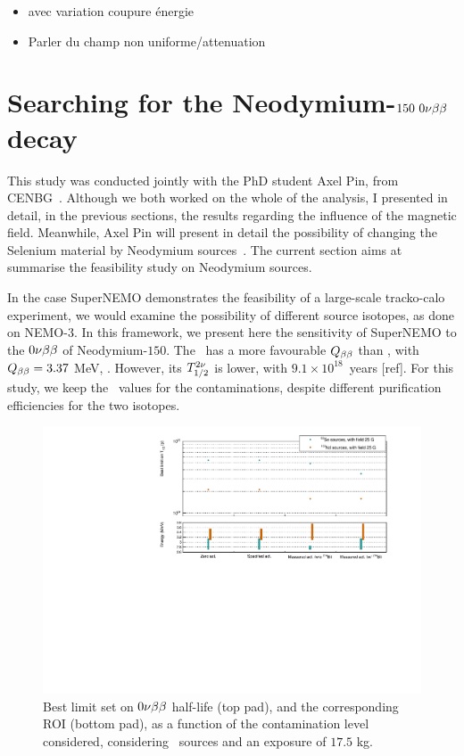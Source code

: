 \begin{itemize}
\item avec variation coupure énergie\\
\item Parler du champ non uniforme/attenuation
\end{itemize}



\section{Searching for the Neodymium-$150~0\nu\beta\beta$ decay}
\label{sec:Nd}

This study was conducted jointly with the PhD student Axel Pin, from CENBG~\cite{}.
Although we both worked on the whole of the analysis, I presented in detail, in the previous sections, the results regarding the influence of the magnetic field.
Meanwhile, Axel Pin will present in detail the possibility of changing the Selenium material by Neodymium sources~\cite{AxelThesis}.
The current section aims at summarise the feasibility study on Neodymium sources.

In the case SuperNEMO demonstrates the feasibility of a large-scale tracko-calo experiment, we would examine the possibility of different source isotopes, as done on NEMO-$3$.
In this framework, we present here the sensitivity of SuperNEMO to the $0\nu\beta\beta$ of Neodymium-$150$.
The \Nd\ has a more favourable $Q_{\beta\beta}$ than \Se, with $Q_{\beta\beta} = 3.37$ MeV, .
However, its $T_{1/2}^{2\nu}$ is lower, with $9.1\times 10^{18}$~years [ref].
For this study, we keep the \Se\ values for the contaminations, despite different purification efficiencies for the two isotopes.

\begin{figure}[h]
  \centering
  \includegraphics[width=1.1\textwidth]{Sensitivity/fig_sensitivity/contamination_level_isotope.pdf}
  \caption{Best limit set on $0\nu\beta\beta$ half-life (top pad), and the corresponding ROI (bottom pad), as a function of the contamination level considered, considering \Nd\ sources and an exposure of $17.5$ kg.
    \label{fig:sensitivity_nd}}
\end{figure}

